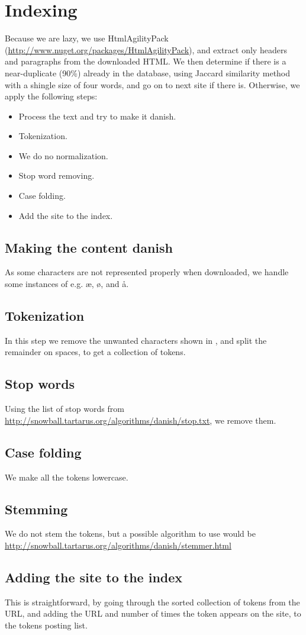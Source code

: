 \section{Indexing}
Because we are lazy, we use HtmlAgilityPack (\url{http://www.nuget.org/packages/HtmlAgilityPack}), and extract only headers and paragraphs from the downloaded HTML. We then determine if there is a near-duplicate (90\%) already in the database, using Jaccard similarity method with a shingle size of four words, and go on to next site if there is. Otherwise, we apply the following steps:

\begin{itemize}
    \item Process the text and try to make it danish.
	\item Tokenization.
    \item We do no normalization.
	\item Stop word removing.
	\item Case folding.
    \item Add the site to the index.
\end{itemize}

\subsection{Making the content danish}
As some characters are not represented properly when downloaded, we handle some instances of e.g. æ, ø, and å.

\subsection{Tokenization}
In this step we remove the unwanted characters shown in , and split the remainder on spaces, to get a collection of tokens.

\subsection{Stop words}
Using the list of stop words from \url{http://snowball.tartarus.org/algorithms/danish/stop.txt}, we remove them.

\subsection{Case folding}
We make all the tokens lowercase.

\subsection{Stemming}
We do not stem the tokens, but a possible algorithm to use would be \url{http://snowball.tartarus.org/algorithms/danish/stemmer.html}

\subsection{Adding the site to the index}
This is straightforward, by going through the sorted collection of tokens from the URL, and adding the URL and number of times the token appears on the site, to the tokens posting list.